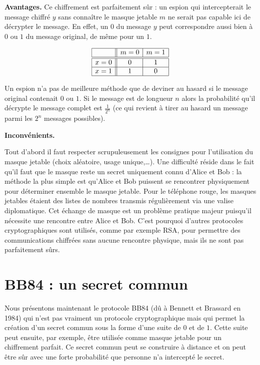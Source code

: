 \documentclass[11pt,class=report,crop=false]{standalone}
\begin{document}
\textbf{Avantages.}
Ce chiffrement est parfaitement sûr : un espion qui intercepterait le message chiffré $y$ sans connaître le masque jetable $m$ ne serait pas capable ici de décrypter le message.
En effet, un $0$ du message $y$ peut correspondre aussi bien à $0$ ou $1$ du message original, de même pour un $1$.

$$\begin{array}{|c||c|c|} \hline
    & m=0 & m=1 \\ \hline\hline
x=0 & 0 & 1 \\ \hline
x=1 & 1 & 0 \\ \hline
\end{array}$$

\smallskip

Un espion n'a pas de meilleure méthode que de deviner au hasard si le message original contenait $0$ ou $1$.
Si le message est de longueur $n$ alors la probabilité qu'il décrypte le message complet est $\frac{1}{2^n}$ 
(ce qui revient à tirer au hasard un message parmi les $2^n$ messages possibles).


\medskip

\textbf{Inconvénients.}

Tout d'abord il faut respecter scrupuleusement les consignes pour l'utilisation du masque jetable (choix aléatoire, usage unique,\ldots).
Une difficulté réside dans le fait qu'il faut que le masque reste un secret uniquement connu d'Alice et Bob : la méthode la plus simple est qu'Alice et Bob puissent se rencontrer physiquement pour déterminer ensemble le masque jetable. Pour le \og{}téléphone rouge\fg{}, les masques jetables étaient des listes de nombres transmis régulièrement via une valise diplomatique.
Cet échange de masque est un problème pratique majeur puisqu'il nécessite une rencontre entre Alice et Bob. C'est pourquoi d'autres protocoles cryptographiques sont utilisés, comme par exemple RSA, pour permettre des communications chiffrées sans aucune rencontre physique, mais ils ne sont pas parfaitement sûrs.


\section{BB84 : un secret commun}


Nous présentons maintenant le protocole  BB84 (dû à Bennett et Brassard en 1984) qui n'est pas vraiment un protocole cryptographique mais qui permet la création d'un secret commun sous la forme d'une suite de $0$ et de $1$. Cette suite peut ensuite, par exemple, être utilisée comme masque jetable pour un chiffrement parfait.
Ce secret commun peut se construire à distance et on peut être sûr avec une forte probabilité que personne n'a intercepté le secret.
\end{document}
